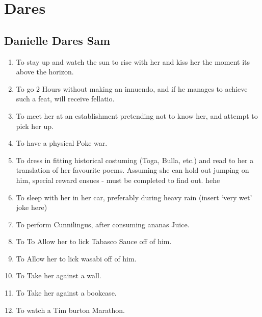 
 

 \section{Dares}

 \renewcommand{\theenumi}{\thesubsection.\arabic{enumi}}

   \subsection{Danielle Dares Sam}

\begin{enumerate}
\item  To stay up and watch the sun to rise with her and kiss her the moment its above the horizon.

\item  To go $2$ Hours without making an innuendo, and if he manages to achieve such a feat, will receive fellatio.

\item  To meet her at an establishment pretending not to know her, and attempt to pick her up.

\item  To have a physical Poke war. 

\item  To dress in fitting historical costuming (Toga, Bulla, etc.) and read to her a translation of her favourite poems.  Assuming she can hold out  jumping on him, special reward ensues - must be completed to find out.  hehe 

\item  To sleep with her in her car, preferably during heavy rain (insert `very wet' joke here) 

\item To perform Cunnilingus, after consuming ananas Juice.

\item To To Allow her to lick Tabasco Sauce off of him.

\item To Allow her to lick wasabi off of him.

\item To Take her against a wall.

\item To Take her against a bookcase.

\item To watch a Tim burton Marathon.

\end{enumerate}

